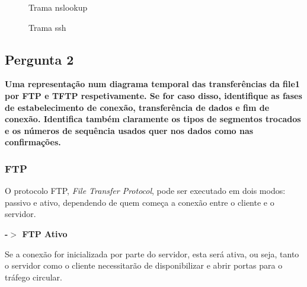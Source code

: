 \documentclass[11pt]{article}
\begin{document}
\begin{figure}[hbt!]
    \centering
    \caption{Trama nslookup}
\end{figure}

\begin{figure}[hbt!]
    \centering
    \caption{Trama ssh}
\end{figure}


\clearpage
\subsection{Pergunta 2}

\textbf{Uma representação num diagrama temporal das transferências da file1 por FTP e TFTP respetivamente. Se for caso disso, identifique as fases de estabelecimento de conexão, transferência de dados e fim de conexão. Identifica também claramente os tipos de segmentos trocados e os números de sequência usados quer nos dados como nas confirmações.}

\subsubsection{FTP}

O protocolo FTP, \textit{File Transfer Protocol}, pode ser executado em dois modos: passivo e ativo, dependendo de quem começa a conexão entre o cliente e o servidor.

\vspace{0.5cm}

\par \textbf{-$>$ FTP Ativo}

\vspace{0.25cm}

Se a conexão for inicializada por parte do servidor, esta será ativa, ou seja, tanto o servidor como o cliente necessitarão de disponibilizar e abrir portas para o tráfego circular.
\end{document}
